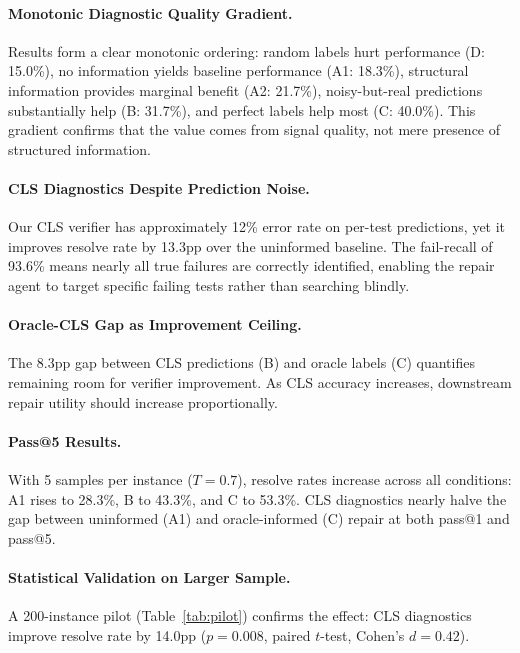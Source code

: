 \documentclass[11pt,a4paper]{article}
\begin{document}
\paragraph{Monotonic Diagnostic Quality Gradient.} Results form a clear monotonic ordering: random labels hurt performance (D: 15.0\%), no information yields baseline performance (A1: 18.3\%), structural information provides marginal benefit (A2: 21.7\%), noisy-but-real predictions substantially help (B: 31.7\%), and perfect labels help most (C: 40.0\%). This gradient confirms that the value comes from signal quality, not mere presence of structured information.

\paragraph{CLS Diagnostics Despite Prediction Noise.} Our CLS verifier has approximately 12\% error rate on per-test predictions, yet it improves resolve rate by 13.3pp over the uninformed baseline. The fail-recall of 93.6\% means nearly all true failures are correctly identified, enabling the repair agent to target specific failing tests rather than searching blindly.

\paragraph{Oracle-CLS Gap as Improvement Ceiling.} The 8.3pp gap between CLS predictions (B) and oracle labels (C) quantifies remaining room for verifier improvement. As CLS accuracy increases, downstream repair utility should increase proportionally.

\paragraph{Pass@5 Results.} With 5 samples per instance ($T=0.7$), resolve rates increase across all conditions: A1 rises to 28.3\%, B to 43.3\%, and C to 53.3\%. CLS diagnostics nearly halve the gap between uninformed (A1) and oracle-informed (C) repair at both pass@1 and pass@5.

\paragraph{Statistical Validation on Larger Sample.} A 200-instance pilot (Table~\ref{tab:pilot}) confirms the effect: CLS diagnostics improve resolve rate by 14.0pp ($p=0.008$, paired $t$-test, Cohen's $d=0.42$).
\end{document}
